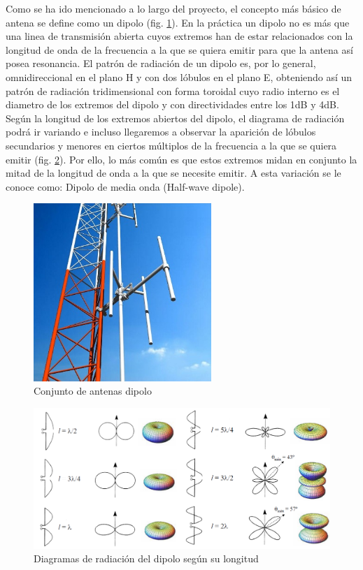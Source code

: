 \par Como se ha ido mencionado a lo largo del proyecto, el concepto más básico de antena se define como un dipolo (fig. \ref{fig:conjuntodipolo}). En la práctica un dipolo no es más que una linea de transmisión abierta cuyos extremos han de estar relacionados con la longitud de onda de la frecuencia a la que se quiera emitir para que la antena así posea resonancia. El patrón de radiación de un dipolo es, por lo general, omnidireccional en el plano H y con dos lóbulos en el plano E, obteniendo así un patrón de radiación tridimensional con forma toroidal cuyo radio interno es el diametro de los extremos del dipolo y con directividades entre los 1dB y 4dB. Según la longitud de los extremos abiertos del dipolo, el diagrama de radiación podrá ir variando e incluso llegaremos a observar la aparición de lóbulos secundarios y menores en ciertos múltiplos de la frecuencia a la que se quiera emitir (fig. \ref{fig:diagramadipolo}). Por ello, lo más común es que estos extremos midan en conjunto la mitad de la longitud de onda a la que se necesite emitir. A esta variación se le conoce como: Dipolo de media onda (Half-wave dipole).
\\
\begin{figure}[h]
    \centering
        \includegraphics[width=0.6\textwidth]{archivos/dipolo/dipoloo}
        \caption{Conjunto de antenas dipolo \citep{Ideal-Antenas2008}}
        \label{fig:conjuntodipolo}
\end{figure}

\begin{figure}[h]
    \centering
        \includegraphics[width=\textwidth]{archivos/dipolo/radiaciones}
        \caption{Diagramas de radiación del dipolo según su longitud}
        \label{fig:diagramadipolo}
\end{figure}

